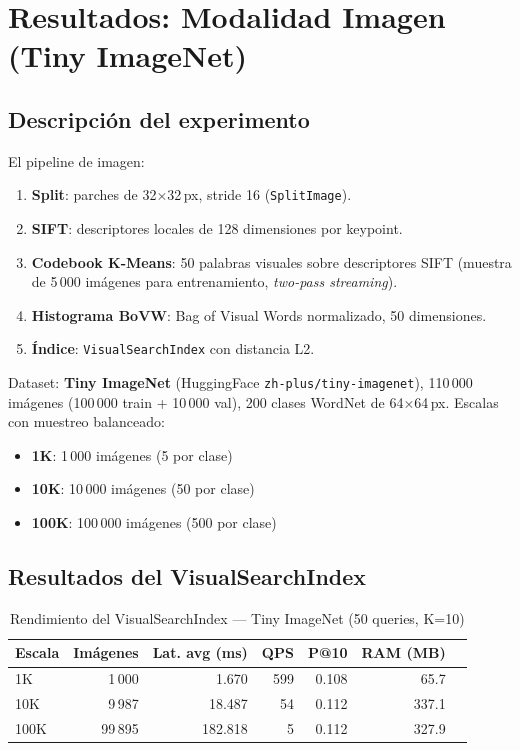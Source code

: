 \documentclass[12pt,a4paper]{article}
\newcommand{\system}[1]{\texttt{\small #1}}
\begin{document}
\section{Resultados: Modalidad Imagen (Tiny ImageNet)}

\subsection{Descripción del experimento}

El pipeline de imagen:
\begin{enumerate}[leftmargin=*, label=\arabic*.]
  \item \textbf{Split}: parches de 32$\times$32\,px, stride 16 (\system{SplitImage}).
  \item \textbf{SIFT}: descriptores locales de 128 dimensiones por keypoint.
  \item \textbf{Codebook K-Means}: 50 palabras visuales sobre descriptores SIFT
        (muestra de 5\,000 imágenes para entrenamiento, \emph{two-pass streaming}).
  \item \textbf{Histograma BoVW}: Bag of Visual Words normalizado, 50 dimensiones.
  \item \textbf{Índice}: \system{VisualSearchIndex} con distancia L2.
\end{enumerate}

\noindent Dataset: \textbf{Tiny ImageNet} (HuggingFace \texttt{zh-plus/tiny-imagenet}),
110\,000 imágenes (100\,000 train + 10\,000 val), 200 clases WordNet de 64$\times$64\,px.
Escalas con muestreo balanceado:
\begin{itemize}
  \item \textbf{1K}: 1\,000 imágenes (5 por clase)
  \item \textbf{10K}: 10\,000 imágenes (50 por clase)
  \item \textbf{100K}: 100\,000 imágenes (500 por clase)
\end{itemize}

\subsection{Resultados del VisualSearchIndex}

\begin{table}[H]
  \centering
  \caption{Rendimiento del VisualSearchIndex — Tiny ImageNet (50 queries, K=10)}
  \begin{tabular}{lrrrrrr}
    \toprule
    \textbf{Escala} & \textbf{Imágenes} & \textbf{Lat. avg (ms)} &
    \textbf{QPS} & \textbf{P@10} & \textbf{RAM (MB)} \\
    \midrule
    1K    & 1\,000  & 1.670   & 599   & 0.108 & 65.7  \\
    10K   & 9\,987  & 18.487  & 54    & 0.112 & 337.1 \\
    100K  & 99\,895 & 182.818 & 5     & 0.112 & 327.9 \\
    \bottomrule
  \end{tabular}
  \label{tab:image-custom}
\end{table}
\end{document}
